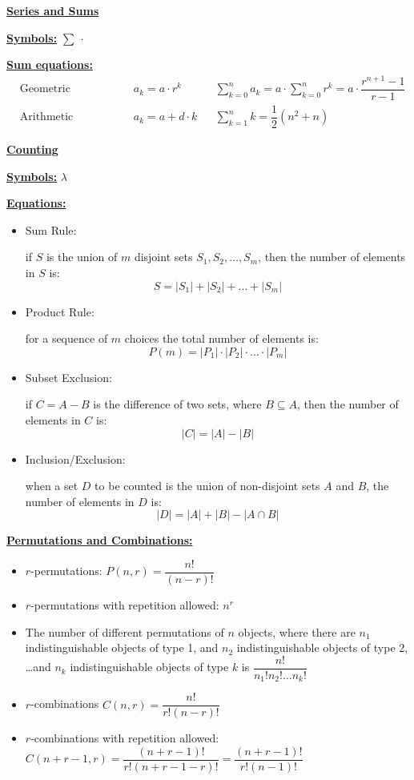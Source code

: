 \documentclass[11pt]{article}
\begin{document}
\begin{center}\underline{\bf \huge Series and Sums}\end{center}
\bigskip

\underline{\bf Symbols:} $\sum \ \cdot$
\bigskip

\underline{\bf Sum equations:} 
\begin{align*}
    &\text{Geometric Progression} &&a_k = a \cdot r^k &&\sum_{k=0}^n a_k = a\cdot \sum_{k=0}^n r^k = a \cdot \dfrac{r^{n+1} - 1}{r-1} \\
    &\text{Arithmetic Progression} &&a_k = a + d\cdot k &&\sum_{k=1}^n k = \dfrac{1}{2}(n^2 + n)
\end{align*}


\newpage
\begin{center}\underline{\bf \huge Counting}\end{center}
\bigskip

\underline{\bf Symbols:} $\lambda$
\bigskip

\underline{\bf Equations:}
\begin{itemize}
    \item Sum Rule: 
    
    if $S$ is the union of $m$ disjoint sets $S_1, S_2, \dots, S_m$, then the number of elements in $S$ is: 
$$ S = |S_1| + |S_2| + \dots + |S_m| $$
    \item Product Rule: 
    
    for a sequence of $m$ choices the total number of elements is: 
$$ P(m) = |P_1|\cdot |P_2| \cdot \dots \cdot |P_m| $$
    \item Subset Exclusion: 
    
    if $C = A - B$ is the difference of two sets, where $B \subseteq A$, then the number of elements in $C$ is:
$$ |C| = |A| - |B| $$
    \item Inclusion/Exclusion: 
    
    when a set $D$ to be counted is the union of non-disjoint sets $A$ and $B$, the number of elements in $D$ is:
$$ |D| = |A| + |B| - |A\cap B| $$
\end{itemize}
\bigskip

\underline{\bf Permutations and Combinations:}
\begin{itemize}
    \item $r$-permutations: $P(n,r) = \dfrac{n!}{(n-r)!}$
    \item $r$-permutations with repetition allowed: $n^r$
    \item The number of different permutations of $n$ objects, where there are $n_1$
indistinguishable objects of type 1, and $n_2$ indistinguishable objects
of type 2, \dots and $n_k$ indistinguishable objects of type $k$ is $\dfrac{n!}{n_1! n_2! \dots n_k!}$
    \item $r$-combinations $C(n,r) = \dfrac{n!}{r!(n-r)!}$
    \item $r$-combinations with repetition allowed: $C(n+r-1,r) = \dfrac{(n+r-1)!}{r!(n+r-1-r)!} = \dfrac{(n+r-1)!}{r!(n-1)!}$
\end{itemize}
\end{document}
